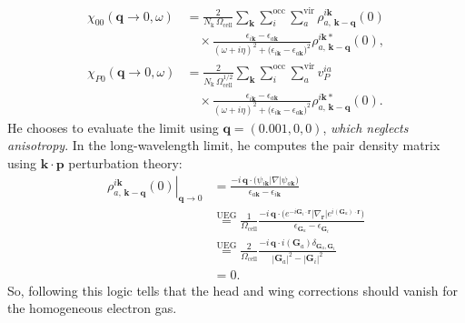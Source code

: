 \begin{align}
\chi_{00}(\mathbf{q} \rightarrow 0, \omega)
  &= \frac{2}{N_{\mathrm{k}}\,\Omega_{\text{cell}}}
     \sum_{\mathbf{k}}
     \sum_i^{\text{occ}}
     \sum_a^{\text{vir}}
     \rho_{a,\,\mathbf{k}-\mathbf{q}}^{i\mathbf{k}}(0)
     \tag{49} \\
  &\quad \times
     \frac{\epsilon_{i\mathbf{k}}-\epsilon_{a\mathbf{k}}}
          {\left(\omega+i\eta\right)^2+\bigl(\epsilon_{i\mathbf{k}}-\epsilon_{a\mathbf{k}}\bigr)^2}
     \rho_{a,\,\mathbf{k}-\mathbf{q}}^{i\mathbf{k}*}(0), \\
\chi_{P0}(\mathbf{q} \rightarrow 0, \omega)
  &= \frac{2}{N_{\mathrm{k}}\,\Omega_{\text{cell}}^{1/2}}
     \sum_{\mathbf{k}}
     \sum_i^{\text{occ}}
     \sum_a^{\text{vir}}
     v_P^{ia}
     \tag{50} \\
  &\quad \times
     \frac{\epsilon_{i\mathbf{k}}-\epsilon_{a\mathbf{k}}}
          {\left(\omega+i\eta\right)^2+\bigl(\epsilon_{i\mathbf{k}}-\epsilon_{a\mathbf{k}}\bigr)^2}
     \rho_{a,\,\mathbf{k}-\mathbf{q}}^{i\mathbf{k}*}(0).
\end{align}
He chooses to evaluate the limit using
$\mathbf{q}=(0.001,0,0)$, \emph{which neglects anisotropy}.
In the long-wavelength limit, he computes the pair density matrix using
$\mathbf{k}\cdot\mathbf{p}$ perturbation theory:
\begin{align}
\left.\rho_{a,\,\mathbf{k}-\mathbf{q}}^{i\mathbf{k}}(0)\right|_{\mathbf{q} \rightarrow 0}
  &= \frac{-i\,\mathbf{q}\cdot
          \bigl(\psi_{i\mathbf{k}}\lvert\nabla\rvert\psi_{a\mathbf{k}}\bigr)}
         {\epsilon_{a\mathbf{k}}-\epsilon_{i\mathbf{k}}} \\
&\overset{\text{UEG}}{=} \frac{1}{\Omega_{\text{cell}}}\frac{-i\,\mathbf{q}\cdot
          \bigl(e^{-i\mathbf{G}_i \cdot\mathbf{r}}\lvert\nabla_{\bm{r}}\rvert e^{i\left(\mathbf{G}_a\right)\cdot\mathbf{r}}\bigr)}
         {\epsilon_{\mathbf{G}_a}-\epsilon_{\mathbf{G}_i}} \\
&\overset{\text{UEG}}{=} \frac{2}{\Omega_{\text{cell}}}\frac{-i\,\mathbf{q}\cdot i\left(\mathbf{G}_a\right)
          \delta_{\mathbf{G}_a, \mathbf{G}_i}}
         {|\mathbf{G}_a|^2-|\mathbf{G}_i|^2} \\
&=0.
\end{align}
So, following this logic tells that the head and wing corrections should vanish for the homogeneous electron gas. 
